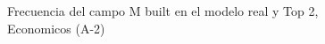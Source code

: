 \begin{figure}[H]
    \centering
    
    \caption{Frecuencia del campo M built en el modelo real y Top 2, Economicos (A-2)}
    \label{frecuency-M Built-top2}
\end{figure}